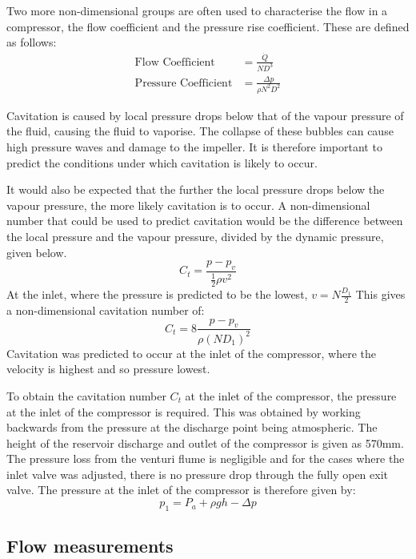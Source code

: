 \documentclass{article}
\begin{document}
Two more non-dimensional groups are often used to characterise the flow in a compressor, the flow coefficient and the pressure rise coefficient.
These are defined as follows:
\begin{align}
    \text{Flow Coefficient} &= \frac{\dot{Q}}{ND^3} \\
    \text{Pressure Coefficient} &= \frac{\Delta p}{\rho N^2 D^2}
\end{align}

Cavitation is caused by local pressure drops below that of the vapour pressure of the fluid, causing the fluid to vaporise.
The collapse of these bubbles can cause high pressure waves and damage to the impeller.
It is therefore important to predict the conditions under which cavitation is likely to occur.

It would also be expected that the further the local pressure drops below the vapour pressure, the more likely cavitation is to occur.
A non-dimensional number that could be used to predict cavitation would be the difference between the local pressure and the vapour pressure, divided by the dynamic pressure, given below.
\begin{equation}
    C_t = \frac{p - p_v}{\frac{1}{2}\rho v^2}
\end{equation}
At the inlet, where the pressure is predicted to be the lowest, $v = N \frac{D_1}{2}$
This gives a non-dimensional cavitation number of:
\begin{equation}
    C_t = 8\frac{p - p_v}{\rho (ND_1)^2}
\end{equation}
Cavitation was predicted to occur at the inlet of the compressor, where the velocity is highest and so pressure lowest.

To obtain the cavitation number $C_t$ at the inlet of the compressor, the pressure at the inlet of the compressor is required.
This was obtained by working backwards from the pressure at the discharge point being atmospheric.
The height of the reservoir discharge and outlet of the compressor is given as 570mm. The pressure loss from the
venturi flume is negligible and for the cases where the inlet valve was adjusted, there is no pressure drop through the fully open exit valve.
The pressure at the inlet of the compressor is therefore given by:
\begin{equation}
    p_1 =  P_a + \rho g h - \Delta p
\end{equation}


\subsection{Flow measurements}
\end{document}
